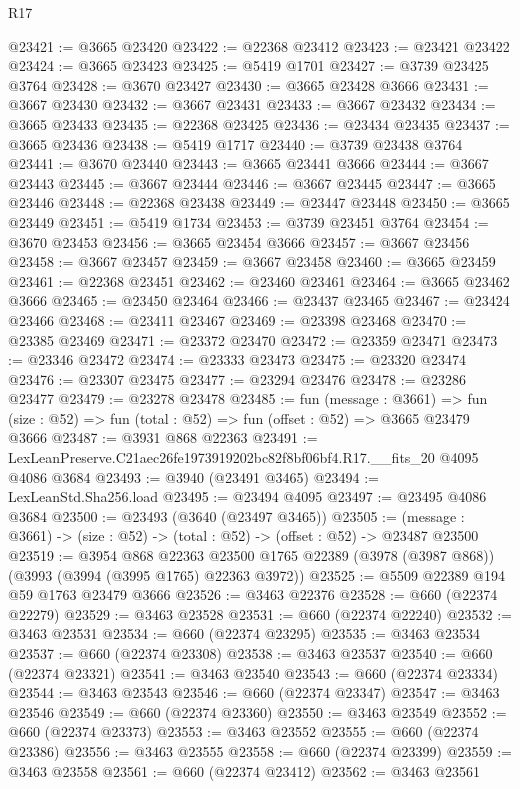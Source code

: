 \begin{lexlean}{R17}
\begin{coremodule}
@23421 := @3665 @23420
@23422 := @22368 @23412
@23423 := @23421 @23422
@23424 := @3665 @23423
@23425 := @5419 @1701
@23427 := @3739 @23425 @3764
@23428 := @3670 @23427
@23430 := @3665 @23428 @3666
@23431 := @3667 @23430
@23432 := @3667 @23431
@23433 := @3667 @23432
@23434 := @3665 @23433
@23435 := @22368 @23425
@23436 := @23434 @23435
@23437 := @3665 @23436
@23438 := @5419 @1717
@23440 := @3739 @23438 @3764
@23441 := @3670 @23440
@23443 := @3665 @23441 @3666
@23444 := @3667 @23443
@23445 := @3667 @23444
@23446 := @3667 @23445
@23447 := @3665 @23446
@23448 := @22368 @23438
@23449 := @23447 @23448
@23450 := @3665 @23449
@23451 := @5419 @1734
@23453 := @3739 @23451 @3764
@23454 := @3670 @23453
@23456 := @3665 @23454 @3666
@23457 := @3667 @23456
@23458 := @3667 @23457
@23459 := @3667 @23458
@23460 := @3665 @23459
@23461 := @22368 @23451
@23462 := @23460 @23461
@23464 := @3665 @23462 @3666
@23465 := @23450 @23464
@23466 := @23437 @23465
@23467 := @23424 @23466
@23468 := @23411 @23467
@23469 := @23398 @23468
@23470 := @23385 @23469
@23471 := @23372 @23470
@23472 := @23359 @23471
@23473 := @23346 @23472
@23474 := @23333 @23473
@23475 := @23320 @23474
@23476 := @23307 @23475
@23477 := @23294 @23476
@23478 := @23286 @23477
@23479 := @23278 @23478
@23485 := fun (message : @3661) =>
  fun (size : @52) => fun (total : @52) => fun (offset : @52) => @3665 @23479 @3666
@23487 := @3931 @868 @22363
@23491 := LexLeanPreserve.C21aec26fe1973919202bc82f8bf06bf4.R17.__fits_20 @4095 @4086 @3684
@23493 := @3940 (@23491 @3465)
@23494 := LexLeanStd.Sha256.load
@23495 := @23494 @4095
@23497 := @23495 @4086 @3684
@23500 := @23493 (@3640 (@23497 @3465))
@23505 := (message : @3661) -> (size : @52) -> (total : @52) -> (offset : @52) -> @23487 @23500
@23519 := @3954
    @868
    @22363
    @23500
    @1765
    @22389
    (@3978 (@3987 @868))
    (@3993 (@3994 (@3995 @1765) @22363 @3972))
@23525 := @5509 @22389 @194 @59 @1763 @23479 @3666
@23526 := @3463 @22376
@23528 := @660 (@22374 @22279)
@23529 := @3463 @23528
@23531 := @660 (@22374 @22240)
@23532 := @3463 @23531
@23534 := @660 (@22374 @23295)
@23535 := @3463 @23534
@23537 := @660 (@22374 @23308)
@23538 := @3463 @23537
@23540 := @660 (@22374 @23321)
@23541 := @3463 @23540
@23543 := @660 (@22374 @23334)
@23544 := @3463 @23543
@23546 := @660 (@22374 @23347)
@23547 := @3463 @23546
@23549 := @660 (@22374 @23360)
@23550 := @3463 @23549
@23552 := @660 (@22374 @23373)
@23553 := @3463 @23552
@23555 := @660 (@22374 @23386)
@23556 := @3463 @23555
@23558 := @660 (@22374 @23399)
@23559 := @3463 @23558
@23561 := @660 (@22374 @23412)
@23562 := @3463 @23561

\end{coremodule}
\end{lexlean}

